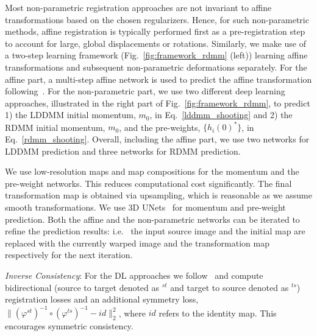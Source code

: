\documentclass{article}
\numberwithin{equation}{section}
\newcommand{\ie}{{i.e.}}
\newcommand{\zy}[1]{{\color{black}{#1}}}
\begin{document}
Most non-parametric registration approaches are not invariant to affine transformations based on the chosen regularizers. Hence, for such non-parametric methods, affine registration is typically performed first as a pre-registration step to account for large, global displacements or rotations. Similarly, we make use of a two-step learning framework (Fig.~\ref{fig:framework_rdmm} (left)) learning affine transformations and subsequent non-parametric deformations separately. For the affine part, a multi-step affine network is used to predict the affine transformation following~\citep{shen2019networks}. For the non-parametric part, we use two different deep learning approaches, illustrated in the right part of Fig.~\ref{fig:framework_rdmm}, to predict 1) the LDDMM initial momentum, $m_0$, in Eq.~\eqref{lddmm_shooting} and 2) the RDMM initial momentum, $m_0$, and the pre-weights, $\{h_i(0)^*\}$, in Eq.~\eqref{rdmm_shooting}. Overall, including the affine part, we use two networks for LDDMM prediction and three networks for RDMM prediction.







We use low-resolution maps and map compositions for the momentum and the pre-weight networks. This reduces computational cost significantly. The final transformation map is obtained via upsampling, which is reasonable as we assume smooth transformations. We use 3D UNets~\citep{cciccek2016_3d_unet} for momentum and pre-weight prediction. Both the affine and the non-parametric networks can be iterated to refine the prediction results: \ie~ the input source image and the initial map are replaced with the currently warped image and the transformation map respectively for the next iteration.

\zy{During training of the non-parametric part, the gradient is first backpropagated through the differentiable interpolation operator, then through the LDDMM/RDMM unit, followed by the momentum generation network and the pre-weight network.}

{\it Inverse Consistency}: For the DL approaches we follow~\cite{shen2019networks} and compute bidirectional (source to target denoted as $^{st}$ and target to source denoted as $^{ts}$) registration losses and an additional symmetry loss, $\|(\varphi^{s t})^{-1} \circ(\varphi^{t s})^{-1}-i d\|_{2}^{2}$, where $id$ refers to the identity map. This encourages symmetric consistency. 
\end{document}
